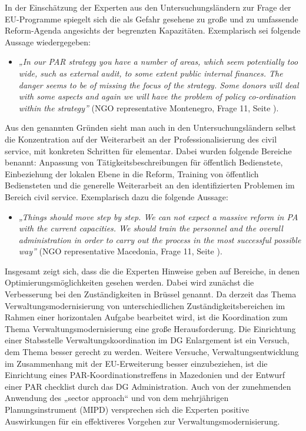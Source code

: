 In der Einschätzung der Experten aus den Untersuchungsländern zur Frage der EU-Programme spiegelt sich die als Gefahr gesehene zu große und zu umfassende Reform-Agenda angesichts der begrenzten Kapazitäten. Exemplarisch sei folgende Aussage wiedergegeben:
\begin{itemize}[label={}]
\item \textit{„In our PAR strategy you have a number of areas, which seem potentially too wide, such as external audit, to some extent public internal finances. The danger seems to be of missing the focus of the strategy. Some donors will deal with some aspects and again we will have the problem of policy co-ordination within the strategy”} (NGO representative Montenegro, Frage 11, Seite \pageref{sec:par priorities}).
\end{itemize}
Aus den genannten Gründen sieht man auch in den Untersuchungsländern selbst die Konzentration auf der Weiterarbeit an der Professionalisierung des civil service, mit konkreten Schritten für elementar. Dabei wurden folgende Bereiche benannt: Anpassung von Tätigkeitsbeschreibungen für öffentlich Bedienstete, Einbeziehung der lokalen Ebene in die Reform, Training von öffentlich Bediensteten und die generelle Weiterarbeit an den identifizierten Problemen im Bereich civil service. Exemplarisch dazu die folgende Aussage:
\begin{itemize}[label={}]
\item \textit{„Things should move step by step. We can not expect a massive reform in PA with the current capacities. We should train the personnel and the overall administration in order to carry out the process in the most successful possible way”} (NGO representative Macedonia, Frage 11, Seite \pageref{sec:par priorities}).
\end{itemize}
Insgesamt zeigt sich, dass die die Experten Hinweise geben auf Bereiche, in denen Optimierungsmöglichkeiten gesehen werden. Dabei wird zunächst die Verbesserung bei den Zuständigkeiten in Brüssel genannt. Da derzeit das Thema Verwaltungsmodernisierung von unterschiedlichen Zuständigkeitsbereichen im Rahmen einer horizontalen Aufgabe bearbeitet wird, ist die Koordination zum Thema Verwaltungsmodernisierung eine große Herausforderung. Die Einrichtung einer Stabsstelle Verwaltungskoordination im DG Enlargement ist ein Versuch, dem Thema besser gerecht zu werden. Weitere Versuche, Verwaltungsentwicklung im Zusammenhang mit der EU-Erweiterung besser einzubeziehen, ist die Einrichtung eines PAR-Koordinationstreffens in Mazedonien und der Entwurf einer PAR checklist durch das DG Administration. Auch von der zunehmenden Anwendung des „sector approach“ und von dem mehrjährigen Planungsinstrument (MIPD) versprechen sich die Experten positive Auswirkungen für ein effektiveres Vorgehen zur Verwaltungsmodernisierung.\par
